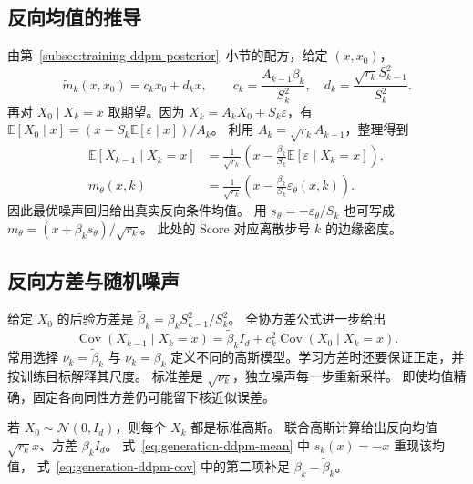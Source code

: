 \subsection{反向均值的推导\requiredderivation}

由第~\ref{subsec:training-ddpm-posterior}~小节的配方，给定 \((x,x_0)\)，
\[
 \widetilde m_k(x,x_0)=c_kx_0+d_kx,\qquad
 c_k=\frac{A_{k-1}\beta_k}{S_k^2},\quad
 d_k=\frac{\sqrt{r_k}S_{k-1}^2}{S_k^2}.
\]
再对 \(X_0\mid X_k=x\) 取期望。因为
\(X_k=A_kX_0+S_k\varepsilon\)，有
\(\mathbb E[X_0\mid x]=(x-S_k\mathbb E[\varepsilon\mid x])/A_k\)。
利用 \(A_k=\sqrt{r_k}A_{k-1}\)，整理得到
\begin{equation}
 \begin{aligned}
 \mathbb E[X_{k-1}\mid X_k=x]
  &=\frac1{\sqrt{r_k}}\left(x-\frac{\beta_k}{S_k}
       \mathbb E[\varepsilon\mid X_k=x]\right),\\
 m_\theta(x,k)&=\frac1{\sqrt{r_k}}
       \left(x-\frac{\beta_k}{S_k}\varepsilon_\theta(x,k)\right).
 \end{aligned}
 \label{eq:generation-ddpm-mean}
\end{equation}
因此最优噪声回归给出真实反向条件均值。
用 \(s_\theta=-\varepsilon_\theta/S_k\) 也可写成
\(m_\theta=(x+\beta_k s_\theta)/\sqrt{r_k}\)。
此处的 Score 对应离散步号 \(k\) 的边缘密度。

\subsection{反向方差与随机噪声}

给定 \(X_0\) 的后验方差是
\(\widetilde\beta_k=\beta_k S_{k-1}^2/S_k^2\)。
全协方差公式进一步给出
\begin{equation}
 \operatorname{Cov}(X_{k-1}\mid X_k=x)
 =\widetilde\beta_k I_d+c_k^2\operatorname{Cov}(X_0\mid X_k=x).
 \label{eq:generation-ddpm-cov}
\end{equation}
常用选择 \(\nu_k=\widetilde\beta_k\) 与 \(\nu_k=\beta_k\)
定义不同的高斯模型。学习方差时还要保证正定，并按训练目标解释其尺度。
标准差是 \(\sqrt{\nu_k}\)，独立噪声每一步重新采样。
即使均值精确，固定各向同性方差仍可能留下核近似误差。

\begin{example}[平稳高斯的真实反向方差]
若 \(X_0\sim\mathcal N(0,I_d)\)，则每个 \(X_k\) 都是标准高斯。
联合高斯计算给出反向均值 \(\sqrt{r_k}x\)、方差 \(\beta_k I_d\)。
式~\eqref{eq:generation-ddpm-mean} 中 \(s_k(x)=-x\) 重现该均值，
式~\eqref{eq:generation-ddpm-cov} 中的第二项补足
\(\beta_k-\widetilde\beta_k\)。
\end{example}

